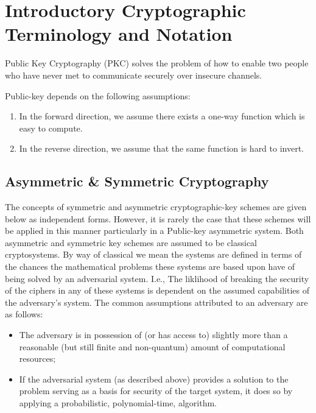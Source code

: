 \section{Introductory Cryptographic Terminology and Notation}


Public Key Cryptography (PKC) solves the problem of how to enable two people who have never met to communicate securely over insecure channels. 
 

Public-key depends on the following assumptions: 
\begin{enumerate}
 \item In the forward direction, we assume there exists a one-way function which is easy to compute.
 \item In the reverse direction, we assume that the same function is hard to invert. 
 \end{enumerate}
 
 
 

\subsection{Asymmetric \& Symmetric Cryptography} 

The concepts of symmetric and asymmetric cryptographic-key schemes are given below as independent forms. However, it is rarely the case that these schemes will be applied in this manner particularly in a Public-key asymmetric system. Both asymmetric and symmetric key schemes are assumed to be classical cryptosystems. By way of classical we mean the systems are defined in terms of the chances the mathematical problems these systems are based upon have of being solved by an adversarial system. I.e., The liklihood of breaking the security of the ciphers in any of these systems is dependent on the assumed capabilities of the adversary's system. The common assumptions attributed to an adversary are as follows:

\begin{itemize}
    \item The adversary is in possession of (or has access to) slightly more than a reasonable (but still finite and non-quantum) amount of computational resources;
    \item If the adversarial system (as described above) provides a solution to the problem serving as a basis for security of the target system, it does so by applying a probabilistic, polynomial-time, algorithm. 
\end{itemize}

